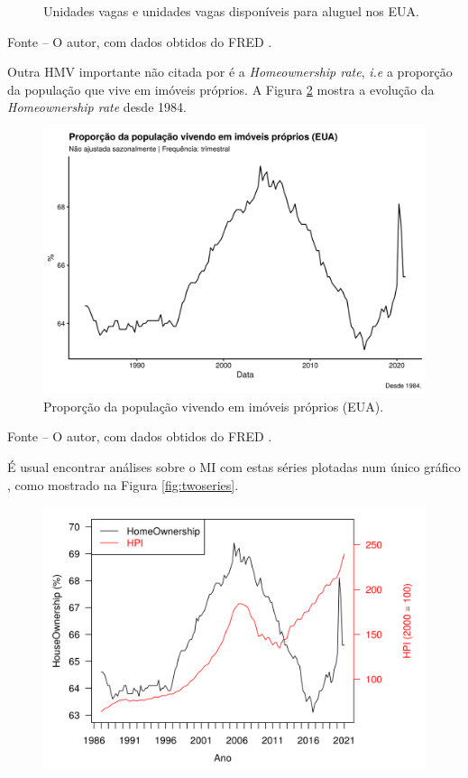 \documentclass[
	12pt,				%
	oneside,			%
	a4paper,			%
	chapter=TITLE,		%
	section=TITLE,		%
	english,			%
	brazil				%
	]{abntex2}
\newcommand{\bcenter}{\begin{center}}
\newcommand{\ecenter}{\end{center}}
\begin{document}
\begin{refsection}
\begin{figure}[H]
{}

\caption{Unidades vagas e unidades vagas disponíveis para aluguel nos EUA.}\label{fig:vacancy}
\end{figure}
\bcenter

\small Fonte -- O autor, com dados obtidos do FRED \autocites{ERENTUSQ176N}{EVACANTUSQ176N}.
\ecenter

Outra \gls{HMV} importante não citada por \textcite{macroHousing} é a \emph{Homeownership rate},
\emph{i.e} a proporção da população que vive em imóveis próprios. A Figura
\ref{fig:USHOWN} mostra a evolução da \emph{Homeownership rate} desde 1984.
\begin{figure}[H]

{\centering \includegraphics[width=0.7\linewidth]{images/USHOWN-1} 

}

\caption{Proporção da população vivendo em imóveis próprios (\gls{EUA}).}\label{fig:USHOWN}
\end{figure}
\bcenter

\small Fonte -- O autor, com dados obtidos do FRED \autocite{RSAHORUSQ156S}.
\ecenter

É usual encontrar análises sobre o \gls{MI} com estas séries plotadas num
único gráfico \autocites[ver][]{FRED2014}{FRED2016}{FRED2018}, como mostrado na Figura
\ref{fig:twoseries}.
\begin{figure}[H]

{\centering \includegraphics[width=1\linewidth]{images/twoseries-1} 

}
\end{figure}
\end{refsection}
\end{document}

